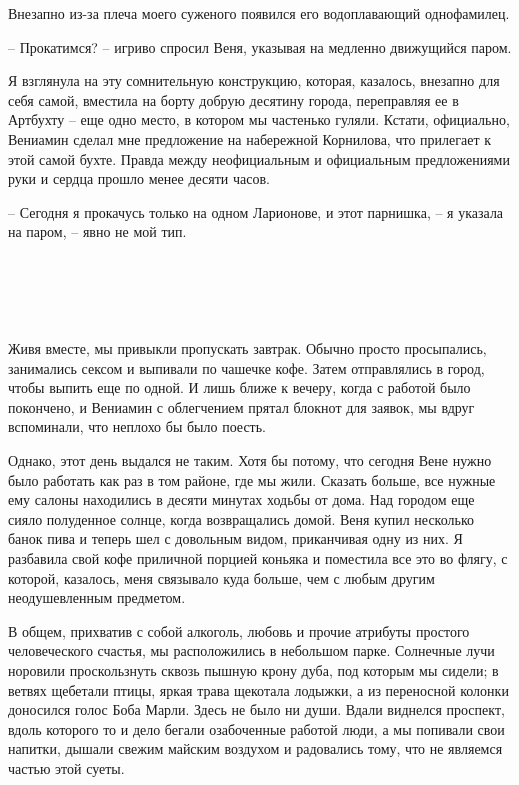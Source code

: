 \documentclass[
]{book}
\begin{document}
Внезапно из-за плеча моего суженого появился его водоплавающий однофамилец.

-- Прокатимся? -- игриво спросил Веня, указывая на медленно движущийся паром.

Я взглянула на эту сомнительную конструкцию, которая, казалось, внезапно для себя самой, вместила на борту добрую десятину города, переправляя ее в Артбухту -- еще одно место, в котором мы частенько гуляли. Кстати, официально, Вениамин сделал мне предложение на набережной Корнилова, что прилегает к этой самой бухте. Правда между неофициальным и официальным предложениями руки и сердца прошло менее десяти часов.

-- Сегодня я прокачусь только на одном Ларионове, и этот парнишка, -- я указала на паром, -- явно не мой тип.

\hypertarget{chapter-17}{%
\chapter{~}\label{chapter-17}}

Живя вместе, мы привыкли пропускать завтрак. Обычно просто просыпались, занимались сексом и выпивали по чашечке кофе. Затем отправлялись в город, чтобы выпить еще по одной. И лишь ближе к вечеру, когда с работой было покончено, и Вениамин с облегчением прятал блокнот для заявок, мы вдруг вспоминали, что неплохо бы было поесть.

Однако, этот день выдался не таким. Хотя бы потому, что сегодня Вене нужно было работать как раз в том районе, где мы жили. Сказать больше, все нужные ему салоны находились в десяти минутах ходьбы от дома. Над городом еще сияло полуденное солнце, когда возвращались домой. Веня купил несколько банок пива и теперь шел с довольным видом, приканчивая одну из них. Я разбавила свой кофе приличной порцией коньяка и поместила все это во флягу, с которой, казалось, меня связывало куда больше, чем с любым другим неодушевленным предметом.

В общем, прихватив с собой алкоголь, любовь и прочие атрибуты простого человеческого счастья, мы расположились в небольшом парке. Солнечные лучи норовили проскользнуть сквозь пышную крону дуба, под которым мы сидели; в ветвях щебетали птицы, яркая трава щекотала лодыжки, а из переносной колонки доносился голос Боба Марли. Здесь не было ни души. Вдали виднелся проспект, вдоль которого то и дело бегали озабоченные работой люди, а мы попивали свои напитки, дышали свежим майским воздухом и радовались тому, что не являемся частью этой суеты.
\end{document}
